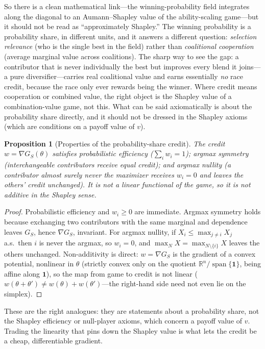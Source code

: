 \documentclass[11pt]{article}
\newcommand{\R}{\mathbb{R}}
\newtheorem{proposition}{Proposition}
\begin{document}
So there is a clean mathematical link---the winning-probability field integrates
along the diagonal to an Aumann--Shapley value of the ability-scaling game---but it
should not be read as ``approximately Shapley.'' The winning probability is a
probability share, in different units, and it answers a different question:
\emph{selection relevance} (who is the single best in the field) rather than
\emph{coalitional cooperation} (average marginal value across coalitions). The sharp
way to see the gap: a contributor that is never individually the best but improves
every blend it joins---a pure diversifier---carries real coalitional value and earns
essentially \emph{no} race credit, because the race only ever rewards being the
winner. Where credit means cooperation or combined value, the right object is the
Shapley value of a combination-value game, not this. What can be said axiomatically
is about the probability share directly, and it should not be dressed in the Shapley
axioms (which are conditions on a payoff value of $v$).

\begin{proposition}[Properties of the probability-share credit]
\label{prop:axioms}
The credit $w = \nabla G_S(\theta)$ satisfies \emph{probabilistic efficiency}
($\sum_i w_i = 1$); \emph{argmax symmetry} (interchangeable contributors receive
equal credit); and \emph{argmax nullity} (a contributor almost surely never the
maximizer receives $w_i = 0$ and leaves the others' credit unchanged). It is not a
linear functional of the game, so it is not additive in the Shapley sense.
\end{proposition}
\begin{proof}
Probabilistic efficiency and $w_i \ge 0$ are immediate. Argmax symmetry holds because
exchanging two contributors with the same marginal and dependence leaves $G_S$, hence
$\nabla G_S$, invariant. For argmax nullity, if $X_i \le \max_{j\neq i} X_j$ a.s.\
then $i$ is never the argmax, so $w_i = 0$, and $\max_N X = \max_{N\setminus\{i\}} X$
leaves the others unchanged. Non-additivity is direct: $w = \nabla G_S$ is the
gradient of a convex potential, nonlinear in $\theta$ (strictly convex only on the
quotient $\R^n/\!\operatorname{span}\{\mathbf 1\}$, being affine along $\mathbf 1$),
so the map from game to credit is not linear ($w(\theta+\theta') \neq w(\theta) +
w(\theta')$---the right-hand side need not even lie on the simplex).
\end{proof}

These are the right analogues: they are statements about a probability share, not the
Shapley efficiency or null-player axioms, which concern a payoff value of $v$.
Trading the linearity that pins down the Shapley value is what lets the credit be a
cheap, differentiable gradient.
\end{document}
